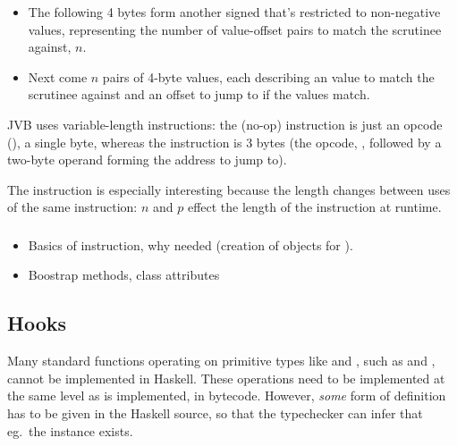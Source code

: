 \documentclass[dissertation.tex]{subfiles}
\begin{document}
{{{\begin{itemize}
{                For this description, `offset' means `signed relative address difference from the address of the opcode of the instruction to the address of the target': if a  instruction is 30 bytes long, the offset used to jump to the immediately subsequent instruction would be 30, regardless of the position of the instruction in the file or the position of the offset within the instruction.
            }
            \item
            {
                The following 4 bytes form another signed  that's restricted to non-negative values, representing the number of value-offset pairs to match the scrutinee against, \(n\).
            }
            \item
            {
                Next come \(n\) pairs of 4-byte values, each describing an  value to match the scrutinee against and an offset to jump to if the values match.
            }
            \end{itemize}

            JVB uses variable-length instructions: the  (no-op) instruction is just an opcode (), a single byte, whereas the  instruction is 3 bytes (the opcode, , followed by a two-byte operand forming the address to jump to).

            The  instruction is especially interesting because the length changes between uses of the same instruction: \(n\) and \(p\) effect the length of the instruction at runtime.
        }
        \subsubsection{}
        {

            \begin{itemize}
            \item
            {
                Basics of instruction, why needed (creation of  objects for ).
            }
            \item Boostrap methods, class attributes
            \end{itemize}
        }
    }
    \subsection{Hooks}\label{sec:hooks}
    {
        Many standard functions operating on primitive types like  and , such as \haskell{(+)} and \haskell{(==)}, cannot be implemented in Haskell. These operations need to be implemented at the same level as  is implemented, in bytecode. However, \textit{some} form of definition has to be given in the Haskell source, so that the typechecker can infer that eg.\ the instance exists.

}}
\end{document}
